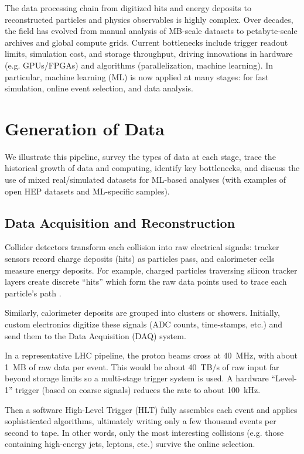 \documentclass[letterpaper,12pt]{article}
\begin{document}
\begin{spacing}{1.125}
The data processing chain from digitized hits and energy deposits to reconstructed particles and physics observables is highly complex. Over decades, the field has evolved from manual analysis of MB-scale datasets to petabyte-scale archives and global compute grids. Current bottlenecks include trigger readout limits, simulation cost, and storage throughput, driving innovations in hardware (e.g. GPUs/FPGAs) and algorithms (parallelization, machine learning). In particular, machine learning (ML) is now applied at many stages: for fast simulation, online event selection, and data analysis.

\section{Generation of Data}

We illustrate this pipeline, survey the types of data at each stage, trace the historical growth of data and computing, identify key bottlenecks, and discuss the use of mixed real/simulated datasets for ML-based analyses (with examples of open HEP datasets and ML-specific samples).

\subsection{Data Acquisition and Reconstruction}

Collider detectors transform each collision into raw electrical signals: tracker sensors record charge deposits (hits) as particles pass, and calorimeter cells measure energy deposits. For example, charged particles traversing silicon tracker layers create discrete “hits” which form the raw data points used to trace each particle’s path
.

Similarly, calorimeter deposits are grouped into clusters or showers. Initially, custom electronics digitize these signals (ADC counts, time-stamps, etc.) and send them to the Data Acquisition (DAQ) system.

In a representative LHC pipeline, the proton beams cross at 40 MHz, with about 1 MB of raw data per event. This would be about 40 TB/s of raw input far beyond storage limits so a multi-stage trigger system is used. A hardware “Level-1” trigger (based on coarse signals) reduces the rate to about 100 kHz.

Then a software High-Level Trigger (HLT) fully assembles each event and applies sophisticated algorithms, ultimately writing only a few thousand events per second to tape. In other words, only the most interesting collisions (e.g. those containing high-energy jets, leptons, etc.) survive the online selection.


\end{spacing}
\end{document}
